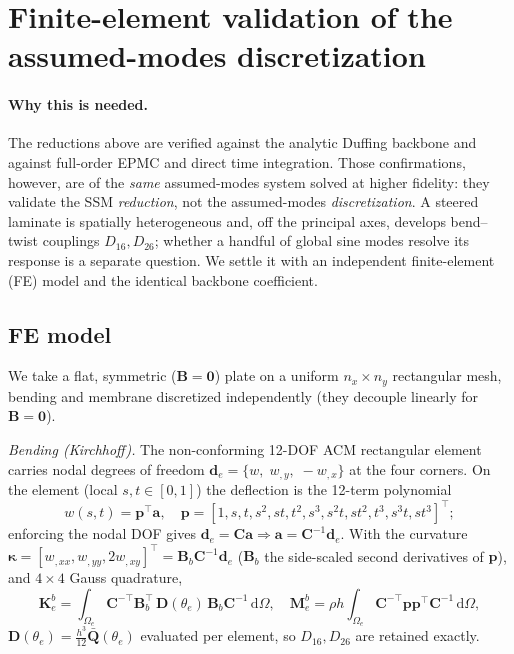 \documentclass[11pt]{article}
\newcommand{\dd}{\mathrm{d}}
\begin{document}
\section{Finite-element validation of the assumed-modes discretization}\label{app:fe}

\paragraph{Why this is needed.} The reductions above are verified against the analytic
Duffing backbone and against full-order EPMC and direct time integration. Those
confirmations, however, are of the \emph{same} assumed-modes system solved at higher
fidelity: they validate the SSM \emph{reduction}, not the assumed-modes
\emph{discretization}. A steered laminate is spatially heterogeneous and, off the
principal axes, develops bend--twist couplings $D_{16},D_{26}$; whether a handful of
global sine modes resolve its response is a separate question. We settle it with an
independent finite-element (FE) model and the identical backbone coefficient.

\subsection{FE model}
We take a flat, symmetric ($\bm B=\bm0$) plate on a uniform $n_x\times n_y$ rectangular
mesh, bending and membrane discretized independently (they decouple linearly for
$\bm B=\bm 0$).

\emph{Bending (Kirchhoff).} The non-conforming 12-DOF ACM rectangular element carries
nodal degrees of freedom $\bm d_e=\{w,\;w_{,y},\;-w_{,x}\}$ at the four corners. On the
element (local $s,t\in[0,1]$) the deflection is the 12-term polynomial
\begin{equation}
w(s,t)=\bm p^{\!\top}\bm a,\quad
\bm p=[1,s,t,s^2,st,t^2,s^3,s^2t,st^2,t^3,s^3t,st^3]^{\!\top};
\end{equation}
enforcing the nodal DOF gives $\bm d_e=\bm C\bm a\Rightarrow\bm a=\bm C^{-1}\bm d_e$. With
the curvature $\bm\kappa=[w_{,xx},w_{,yy},2w_{,xy}]^{\!\top}=\bm B_b\bm C^{-1}\bm d_e$
($\bm B_b$ the side-scaled second derivatives of $\bm p$), and $4\times4$ Gauss quadrature,
\begin{equation}
\bm K^b_e=\!\int_{\Omega_e}\!\bm C^{-\top}\bm B_b^{\!\top}\,\bm D(\theta_e)\,\bm B_b\bm C^{-1}\,\dd\Omega,
\quad
\bm M^b_e=\rho h\!\int_{\Omega_e}\!\bm C^{-\top}\bm p\bm p^{\!\top}\bm C^{-1}\,\dd\Omega,
\end{equation}
$\bm D(\theta_e)=\tfrac{h^3}{12}\bar{\bm Q}(\theta_e)$ evaluated per element, so
$D_{16},D_{26}$ are retained exactly.
\end{document}
